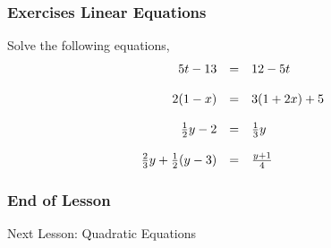 \documentclass[xcolor=dvipsnames]{beamer}
\begin{document}
\begin{frame}
  \frametitle{Exercises Linear Equations}
{\ubung} Solve the following equations,
\begin{equation}
  \label{eq:b1}
  \begin{array}{rcl}
    5t-13&=&12-5t \\ 
    \hspace{.5in} && \\
    2(1-x)&=&3(1+2x)+5 \\ 
    \hspace{.5in} && \\
    \frac{1}{2}y-2&=&\frac{1}{3}y \\ 
    \hspace{.5in} && \\
    \frac{2}{3}y+\frac{1}{2}(y-3)&=&\frac{y+1}{4} \\ 
  \end{array}
\end{equation}
\end{frame}

\begin{frame}
  \frametitle{End of Lesson}
Next Lesson: Quadratic Equations
\end{frame}
\end{document}
